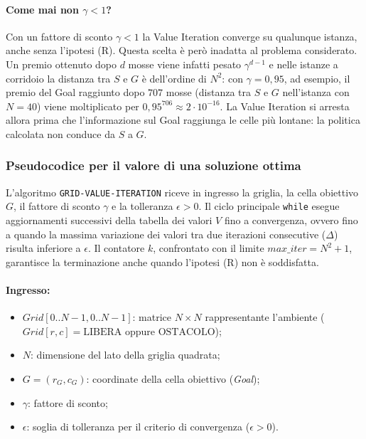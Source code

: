 \paragraph{Come mai non $\gamma < 1$?}
Con un fattore di sconto $\gamma < 1$ la Value Iteration converge su qualunque istanza, anche senza l'ipotesi (R). Questa scelta è però inadatta al problema considerato. Un premio ottenuto dopo $d$ mosse viene infatti pesato $\gamma^{d-1}$ e nelle istanze a corridoio la distanza tra $S$ e $G$ è dell'ordine di $N^2$: con $\gamma = 0{,}95$, ad esempio, il premio del Goal raggiunto dopo $707$ mosse (distanza tra $S$ e $G$ nell'istanza con $N = 40$) viene moltiplicato per $0{,}95^{706} \approx 2 \cdot 10^{-16}$. La Value Iteration si arresta allora prima che l'informazione sul Goal raggiunga le celle più lontane: la politica calcolata non conduce da $S$ a $G$.

\subsubsection{Pseudocodice per il valore di una soluzione ottima}
L'algoritmo \texttt{GRID-VALUE-ITERATION} riceve in ingresso la griglia, la cella obiettivo $G$, il fattore di sconto $\gamma$ e la tolleranza $\epsilon > 0$. Il ciclo principale \texttt{while} esegue aggiornamenti successivi della tabella dei valori $V$ fino a convergenza, ovvero fino a quando la massima variazione dei valori tra due iterazioni consecutive ($\Delta$) risulta inferiore a $\epsilon$. Il contatore $k$, confrontato con il limite $max\_iter = N^2 + 1$, garantisce la terminazione anche quando l'ipotesi (R) non è soddisfatta.

\paragraph{Ingresso:}
\begin{itemize}
    \item $Grid[0..N-1, 0..N-1]$: matrice $N \times N$ rappresentante l'ambiente ($Grid[r,c] = \text{LIBERA}$ oppure $\text{OSTACOLO}$);
    \item $N$: dimensione del lato della griglia quadrata;
    \item $G = (r_G, c_G)$: coordinate della cella obiettivo (\textit{Goal});
    \item $\gamma$: fattore di sconto;
    \item $\epsilon$: soglia di tolleranza per il criterio di convergenza ($\epsilon > 0$).
\end{itemize}

